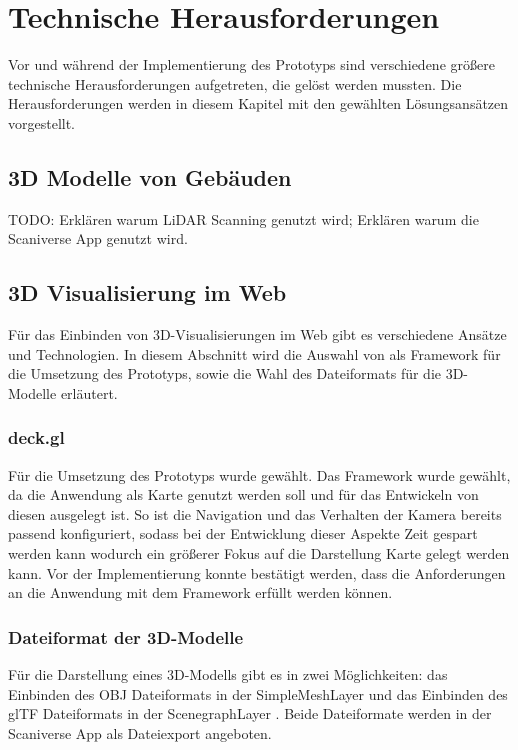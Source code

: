 \newpage
\section{Technische Herausforderungen}
Vor und während der Implementierung des Prototyps sind verschiedene größere technische Herausforderungen aufgetreten, die gelöst werden mussten. Die Herausforderungen werden in diesem Kapitel mit den gewählten Lösungsansätzen vorgestellt. 

\subsection{3D Modelle von Gebäuden}
TODO: Erklären warum LiDAR Scanning genutzt wird; Erklären warum die Scaniverse App genutzt wird.

\subsection{3D Visualisierung im Web}
Für das Einbinden von 3D-Visualisierungen im Web gibt es verschiedene Ansätze und Technologien. In diesem Abschnitt wird die Auswahl von \deckgl{} als Framework für die Umsetzung des Prototyps, sowie die Wahl des Dateiformats für die 3D-Modelle erläutert.

\subsubsection{deck.gl}
Für die Umsetzung des Prototyps wurde \deckgl{} gewählt. Das Framework wurde gewählt, da die Anwendung als Karte genutzt werden soll und \deckgl{} für das Entwickeln von diesen ausgelegt ist. So ist die Navigation und das Verhalten der Kamera bereits passend konfiguriert, sodass bei der Entwicklung dieser Aspekte Zeit gespart werden kann wodurch ein größerer Fokus auf die Darstellung Karte gelegt werden kann. Vor der Implementierung konnte bestätigt werden, dass die Anforderungen an die Anwendung mit dem Framework erfüllt werden können.

\subsubsection{Dateiformat der 3D-Modelle}\label{sec:ModelFileFormat}
Für die Darstellung eines 3D-Modells gibt es in \deckgl{} zwei Möglichkeiten: das Einbinden des \ac{OBJ} Dateiformats in der SimpleMeshLayer \cite{DeckglSimpleMeshLayer} und das Einbinden des \ac{glTF} Dateiformats in der ScenegraphLayer \cite{DeckglScenegraphLayer}. Beide Dateiformate werden in der Scaniverse App als Dateiexport angeboten.

